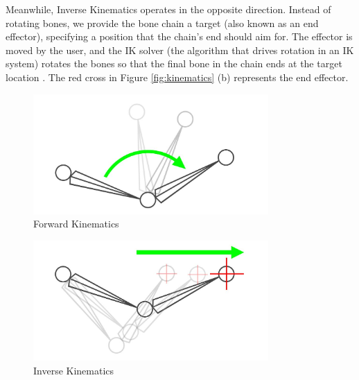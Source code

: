 Meanwhile, Inverse Kinematics operates in the opposite direction. Instead of rotating bones, we provide the bone chain a target (also known as an end effector), specifying a position that the chain's end should aim for. The effector is moved by the user, and the IK solver (the algorithm that drives rotation in an IK system) rotates the bones so that the final bone in the chain ends at the target location \cite{IK}. The red cross in Figure \ref{fig:kinematics} (b) represents the end effector.

\begin{table}[!htb]
    \begin{minipage}{\linewidth}
        \centering
        \begin{subfigure}{0.49\textwidth}
            \centering
            \includegraphics[width=0.8\textwidth]{figures/diagram_FK.png}
            \caption{Forward Kinematics \cite{IK}}
        \end{subfigure}
        \begin{subfigure}{0.49\textwidth}
            \includegraphics[width=0.8\textwidth]{figures/diagramIK.png}
            \centering
            \caption{Inverse Kinematics \cite{IK}}
        \end{subfigure}
        \label{fig:kinematics}
	\end{minipage}
\end{table}

